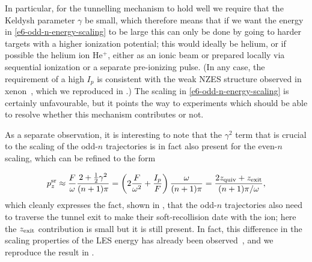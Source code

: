 %


In particular, for the tunnelling mechanism to hold well we require that the Keldysh parameter $\gamma$ be small, which therefore means that if we want the energy in \eqref{e6-odd-n-energy-scaling} to be large this can only be done by going to harder targets with a higher ionization potential; this would ideally be helium, or if possible the helium ion $\mathrm{He^+}$, either as an ionic beam or prepared locally via sequential ionization or a separate pre-ionizing pulse. (In any case, the requirement of a high $I_p$ is consistent with the weak NZES structure observed in xenon~\cite{Wolter_PRX}, which we reproduced in .) The scaling in \eqref{e6-odd-n-energy-scaling} is certainly unfavourable, but it points the way to experiments which should be able to resolve whether this mechanism contributes or not. 




As a separate observation, it is interesting to note that the $\gamma^2$ term that is crucial to the scaling of the odd-$n$ trajectories is in fact also present for the even-$n$ scaling, which can be refined to the form

\begin{equation}
p_z^{\mathrm{sr}} 
\approx \frac F\omega \frac{2+\frac12 \gamma^2}{(n+1)\pi}
= \left(2\frac{F}{\omega^2}+\frac{I_p}{F}\right) \frac{\omega}{(n+1)\pi}
= \frac{2z_\mathrm{quiv} + z_\mathrm{exit}}{(n+1)\pi/\omega},
\label{e6-even-n-scaling-with-zexit}
\end{equation}
which cleanly expresses the fact, shown in , that the odd-$n$ trajectories also need to traverse the tunnel exit to make their soft-recollision date with the ion; here the $z_\mathrm{exit}$ contribution is small but it is still present. In fact, this difference in the scaling properties of the LES energy has already been observed~\cite{murnane_TCSFA_tunnel_exit}, and we reproduce the result in .





